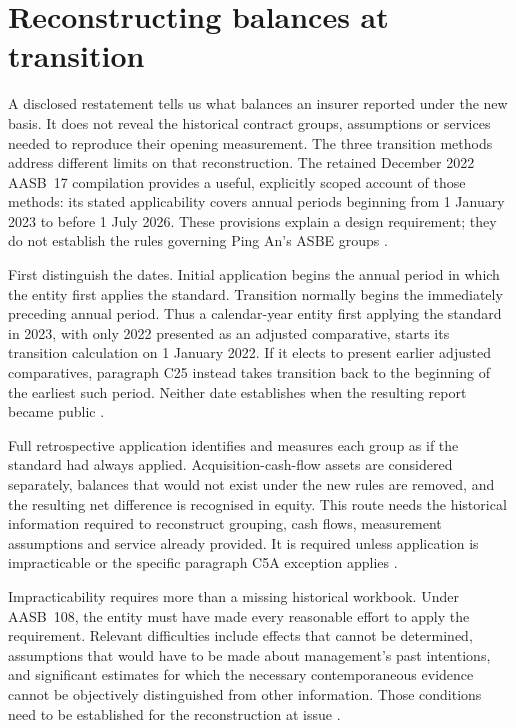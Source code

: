 \clearpage
\section{Reconstructing balances at transition}
\label{sec:insurance-transition}

A disclosed restatement tells us what balances an insurer reported under the
new basis. It does not reveal the historical contract groups, assumptions or
services needed to reproduce their opening measurement. The three transition
methods address different limits on that reconstruction. The retained
December 2022 AASB~17 compilation provides a useful, explicitly scoped account
of those methods: its stated applicability covers annual periods beginning
from 1 January 2023 to before 1 July 2026. These provisions explain a design
requirement; they do not establish the rules governing Ping An's ASBE groups
\citep[Appendix C]{aasb17}.

First distinguish the dates. Initial application begins the annual period in
which the entity first applies the standard. Transition normally begins the
immediately preceding annual period. Thus a calendar-year entity first applying
the standard in 2023, with only 2022 presented as an adjusted comparative,
starts its transition calculation on 1 January 2022. If it elects to present
earlier adjusted comparatives, paragraph C25 instead takes transition back to
the beginning of the earliest such period. Neither date establishes when the
resulting report became public \citep[paragraphs C2 and C25--C27]{aasb17}.

Full retrospective application identifies and measures each group as if the
standard had always applied. Acquisition-cash-flow assets are considered
separately, balances that would not exist under the new rules are removed, and
the resulting net difference is recognised in equity. This route needs the
historical information required to reconstruct grouping, cash flows,
measurement assumptions and service already provided. It is required unless
application is impracticable or the specific paragraph C5A exception applies
\citep[paragraphs C3--C5]{aasb17}.

Impracticability requires more than a missing historical workbook. Under
AASB~108, the entity must have made every reasonable effort to apply the
requirement. Relevant difficulties include effects that cannot be determined,
assumptions that would have to be made about management's past intentions,
and significant estimates for which the necessary contemporaneous evidence
cannot be objectively distinguished from other information. Those conditions
need to be established for the reconstruction at issue
\citep[paragraph~5]{aasb108comp2022}.

